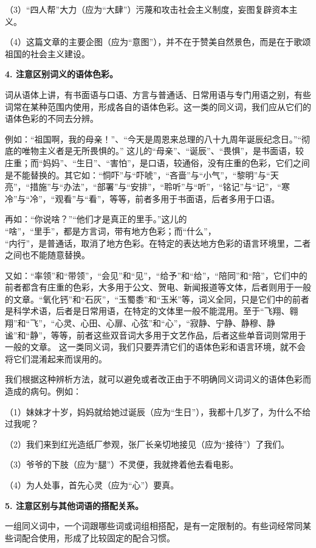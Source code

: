 （3）“四人帮”大力（应为“大肆”）污蔑和攻击社会主义制度，妄图复辟资本主义。

（4）这篇文章的主要企图（应为“意图”），并不在于赞美自然景色，而是在于歌颂祖国的社会主义建设。

\textbf{4. 注意区别词义的语体色彩。}

词从语体上讲，有书面语与口语、方言与普通话、日常用语与专门用语之别，有些词常在某种范围内使用，形成各自的语体色彩。这一类的同义词，我们应从它们的语体色彩的不同去分辨。

例如：“祖国啊，我的母亲！”、“今天是周恩来总理的八十九周年诞辰纪念日。”“彻底的唯物主义者是无所畏惧的。” 这儿的“母亲”、“诞辰”、“畏惧”，是书面语，较庄重；而“妈妈”、“生日”、“害怕”，是口语，较通俗，没有庄重的色彩，它们之间是不能替换的。其它如：“恫吓”与“吓唬”，“吝啬”与“小气”，“黎明”与“天亮”，“措施”与“办法”，“部署”与“安排”，“聆听”与“听”，“铭记”与“记”，“寒冷”与“冷”，“观看”与“看”，等等，前者多用于书面语，后者多用于口语。

再如：“你说啥？”“他们才是真正的里手。”这儿的\\
“啥”，“里手”，都是方言词，带有地方色彩；而“什么”，\\
“内行”，是普通话，取消了地方色彩。在特定的表达地方色彩的语言环境里，二者之间也不能随意替换。

又如：“率领”和“带领”，“会见”和“见”，“给予”和“给”，“陪同”和“陪”，它们中的前者都含有庄重的色彩，大多用于公文、贺电、新闻报道等文体，后者则用于一般的文章。“氧化钙”和“石灰”，“玉蜀黍”和“玉米”等，词义全同，只是它们中的前者是科学术语，后者是日常用语，在特定的文体里一般不能混用。至于“飞翔、翱翔”和“飞”，“心灵、心田、心扉、心弦”和“心”，“寂静、宁静、静穆、静谧”和“静”，等等，前者这些双音词大多用于文艺作品，后者这些单音词则常用于一般的文章。
这一类同义词，我们只要弄清它们的语体色彩和语言环境，就不会将它们混淆起来而误用的。

我们根据这种辨析方法，就可以避免或者改正由于不明确同义词词义的语体色彩而造成的病句。例如：

（1）妹妹才十岁，妈妈就给她过诞辰（应为“生日”），我都十几岁了，为什么不给过我呢？

（2）我们来到红光造纸厂参观，张厂长亲切地接见（应为“接待”）了我们。

（3）爷爷的下肢（应为“腿”）不灵便，我就搀着他去看电影。

（4）为人处事，首先心灵（应为“心”）要真。

\textbf{5. 注意区别与其他词语的搭配关系。}

一组同义词中，一个词跟哪些词或词组相搭配，是有一定限制的。有些词经常同某些词配合使用，形成了比较固定的配合习惯。

